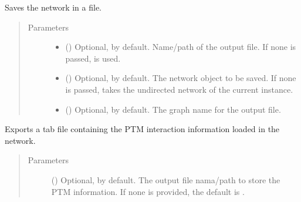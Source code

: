 \documentclass[letterpaper,10pt,english]{sphinxmanual}
\begin{document}
\begin{fulllineitems}
\begin{fulllineitems}
\label{\detokenize{reference:pypath.main.PyPath.export_graphml}}
Saves the network in a  file.
\begin{quote}\begin{description}
\item[{Parameters}] \leavevmode\begin{itemize}
\item {} 
 () \textendash{} Optional,  by default. Name/path of the output file.
If none is passed,
 is used.

\item {} 
 () \textendash{} Optional,  by default. The network object to be
saved. If none is passed, takes the undirected network of
the current instance.

\item {} 
 () \textendash{} Optional,  by default. The graph name for the
output file.

\end{itemize}

\end{description}\end{quote}

\end{fulllineitems}


\begin{fulllineitems}
\label{\detokenize{reference:pypath.main.PyPath.export_ptms_tab}}
Exports a tab file containing the PTM interaction information
loaded in the network.
\begin{quote}\begin{description}
\item[{Parameters}] \leavevmode
{} () \textendash{} Optional,  by default. The output file nama/path to
store the PTM information. If none is provided, the default
is .


\end{description}
\end{quote}
\end{fulllineitems}
\end{fulllineitems}
\end{document}
